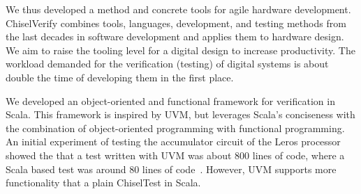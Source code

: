 \documentclass[conference]{IEEEtran}
\begin{document}
We thus developed a method and concrete tools for agile hardware development.
ChiselVerify combines tools, languages, development, and testing methods from the last decades in
software development and applies them to hardware design.
We aim to raise the tooling level for a digital design to increase productivity.
The workload demanded for the verification (testing) of digital systems is about double the time of developing
them in the first place.


We developed an object-oriented and functional framework for verification in Scala.
This framework is inspired by UVM, but leverages Scala's conciseness with the
combination of object-oriented programming with functional programming.
An initial experiment of testing the accumulator circuit of the Leros processor~\cite{leros:arcs2019}
showed the that a test written with UVM was about 800 lines of code, where a Scala based
test was around 80 lines of code~\cite{verify:chisel:2020}.
However, UVM supports more functionality that a plain ChiselTest in Scala.

%
%
%
\end{document}
